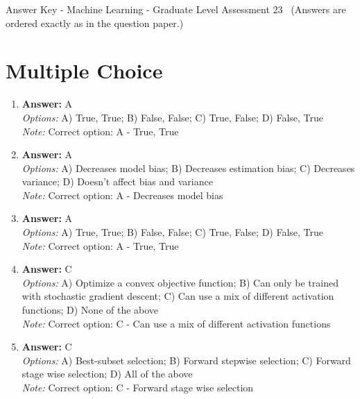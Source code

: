 \documentclass[12pt]{article}
\begin{document}
\begin{center}
Answer Key - Machine Learning - Graduate Level Assessment 23 \
\small (Answers are ordered exactly as in the question paper.)
\end{center}

\section*{Multiple Choice}
\begin{enumerate}[label=\arabic*.]
\item \textbf{Answer:} A
\\ \textit{Options:} A) True, True; B) False, False; C) True, False; D) False, True
\\ \textit{Note:} Correct option: A - True, True
\item \textbf{Answer:} A
\\ \textit{Options:} A) Decreases model bias; B) Decreases estimation bias; C) Decreases variance; D) Doesn't affect bias and variance
\\ \textit{Note:} Correct option: A - Decreases model bias
\item \textbf{Answer:} A
\\ \textit{Options:} A) True, True; B) False, False; C) True, False; D) False, True
\\ \textit{Note:} Correct option: A - True, True
\item \textbf{Answer:} C
\\ \textit{Options:} A) Optimize a convex objective function; B) Can only be trained with stochastic gradient descent; C) Can use a mix of different activation functions; D) None of the above
\\ \textit{Note:} Correct option: C - Can use a mix of different activation functions
\item \textbf{Answer:} C
\\ \textit{Options:} A) Best-subset selection; B) Forward stepwise selection; C) Forward stage wise selection; D) All of the above
\\ \textit{Note:} Correct option: C - Forward stage wise selection
\end{enumerate}
\end{document}
